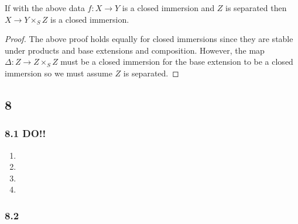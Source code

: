 \documentclass[12pt]{article}
\begin{document}
\begin{corollary}
If with the above data $f : X \to Y$ is a closed immersion and $Z$ is separated then $X \to Y \times_S Z$ is a closed immersion.
\end{corollary}

\begin{proof}
The above proof holds equally for closed immersions since they are stable under products and base extensions and composition. However, the map $\Delta : Z \to Z \times_S Z$ must be a closed immersion for the base extension to be a closed immersion so we must assume $Z$ is separated. 
\end{proof}

\subsection{8}

\subsubsection{8.1 DO!!}

\begin{enumerate}
\item 

\item

\item 

\item 
\end{enumerate}

\subsubsection{8.2}
\end{document}
